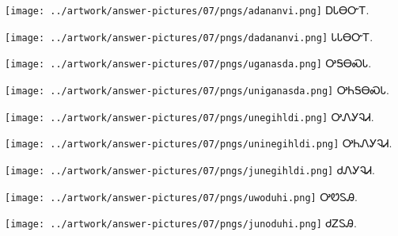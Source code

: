 \documentclass[avery5371,frame]{flashcards}%
\begin{document}
\begin{flashcard}{
\texttt{[image: ../artwork/answer-pictures/07/pngs/adananvi.png]}
}\Huge ᎠᏓᎾᏅᎢ.
\end{flashcard}

\begin{flashcard}{
\texttt{[image: ../artwork/answer-pictures/07/pngs/dadananvi.png]}
}\Huge ᏓᏓᎾᏅᎢ.
\end{flashcard}

\begin{flashcard}{
\texttt{[image: ../artwork/answer-pictures/07/pngs/uganasda.png]}
}\Huge ᎤᎦᎾᏍᏓ.
\end{flashcard}

\begin{flashcard}{
\texttt{[image: ../artwork/answer-pictures/07/pngs/uniganasda.png]}
}\Huge ᎤᏂᎦᎾᏍᏓ.
\end{flashcard}

\begin{flashcard}{
\texttt{[image: ../artwork/answer-pictures/07/pngs/unegihldi.png]}
}\Huge ᎤᏁᎩᎸᏗ.
\end{flashcard}

\begin{flashcard}{
\texttt{[image: ../artwork/answer-pictures/07/pngs/uninegihldi.png]}
}\Huge ᎤᏂᏁᎩᎸᏗ.
\end{flashcard}

\begin{flashcard}{
\texttt{[image: ../artwork/answer-pictures/07/pngs/junegihldi.png]}
}\Huge ᏧᏁᎩᎸᏗ.
\end{flashcard}

\begin{flashcard}{
\texttt{[image: ../artwork/answer-pictures/07/pngs/uwoduhi.png]}
}\Huge ᎤᏬᏚᎯ.
\end{flashcard}

\begin{flashcard}{
\texttt{[image: ../artwork/answer-pictures/07/pngs/junoduhi.png]}
}\Huge ᏧᏃᏚᎯ.
\end{flashcard}
\end{document}
